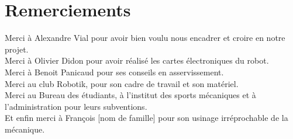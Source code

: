 \chapter*{Remerciements}
    \noindent
    Merci à Alexandre Vial pour avoir bien voulu nous encadrer et croire en notre projet.\\
    Merci à Olivier Didon pour avoir réalisé les cartes électroniques du robot.\\
    Merci à Benoit Panicaud pour ses conseils en asservissement.\\
    Merci au club Robotik, pour son cadre de travail et son matériel.\\
    Merci au Bureau des étudiants, à l'institut des sports mécaniques et à l'administration pour leurs subventions.\\
    Et enfin merci à François [nom de famille] pour son usinage irréprochable de la mécanique.\\

